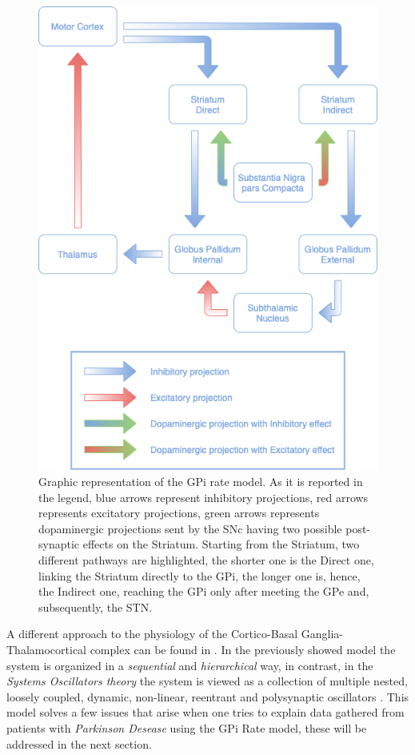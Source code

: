 \documentclass[MSc,english]{Container/thesistemplate}
\begin{document}
\begin{figure}[ht!]
    \centering
    \includegraphics[scale=.4]{Images/gpiratetheory}
    \caption{Graphic representation of the GPi rate model. As it is reported in the legend, blue arrows represent inhibitory projections, red arrows represents excitatory projections, green arrows represents dopaminergic projections sent by the SNc having two possible post-synaptic effects on the Striatum. Starting from the Striatum, two different pathways are highlighted, the shorter one is the Direct one, linking the Striatum directly to the GPi, the longer one is, hence, the Indirect one, reaching the GPi only after meeting the GPe and, subsequently, the STN.}
    \label{fig:gpirate}
\end{figure}

\newpage
A different approach to the physiology of the Cortico-Basal Ganglia-Thalamocortical complex can be found in \cite{montgomery}. In the previously showed model the system is organized in a \emph{sequential} and \emph{hierarchical} way, in contrast, in the \emph{Systems Oscillators theory} the system is viewed as a collection of multiple nested, loosely coupled, dynamic, non-linear, reentrant and polysynaptic oscillators \cite{montgomery}. This model solves a few issues that arise when one tries to explain data gathered from patients with \emph{Parkinson Desease} using the GPi Rate model, these will be addressed in the next section.
\end{document}
